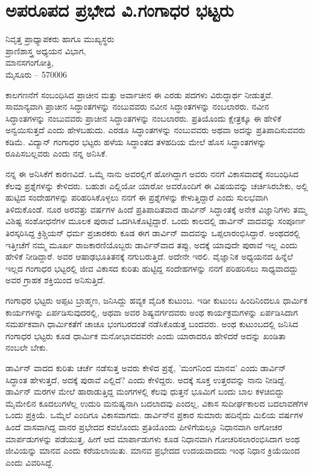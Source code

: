 \chapter{ಅಪರೂಪದ ಪ್ರಭೇದ ವಿ.ಗಂಗಾಧರ ಭಟ್ಟರು}

\begin{center}
\smallskip

ನಿವೃತ್ತ ಪ್ರಾಧ್ಯಾಪಕರು ಹಾಗೂ ಮುಖ್ಯಸ್ಥರು\\
ಪ್ರಾಣಿಶಾಸ್ತ್ರ ಅಧ್ಯಯನ ವಿಭಾಗ,\\ 
ಮಾನಸಗಂಗೋತ್ರಿ,\\ 
ಮೈಸೂರು – 570006
\addrule
\end{center}

ಕಾಲಗಣನೆಗೆ ಸಂಬಂಧಿಸಿದ ಪ್ರಾಚೀನ ಮತ್ತು ಅರ್ವಾಚೀನ ಈ ಎರಡು ಪದಗಳು ವಿರುದ್ಧಾರ್ಥ ನೀಡುತ್ತವೆ.  ಸಾಮಾನ್ಯವಾಗಿ ಪ್ರಾಚೀನ ಸಿದ್ಧಾಂತಗಳನ್ನು ನಂಬುವವರು ನವೀನ ಸಿದ್ಧಾಂತಗಳನ್ನು ನಂಬಲಾರರು.  ನವೀನ ಸಿದ್ಧಾಂತಗಳನ್ನು ನಂಬುವವರು ಪ್ರಾಚೀನ ಸಿದ್ಧಾಂತಗಳನ್ನು ನಂಬಲಾರರು.  ಪ್ರತಿಯೊಂದು ಕ್ಷೇತ್ರಕ್ಕೂ ಈ ಹೇಳಿಕೆ ಅನ್ವಯಿಸುತ್ತದೆ ಎಂದು ಹೇಳಬಹುದು.  ಎರಡೂ ಸಿದ್ಧಾಂತಗಳನ್ನು ನಂಬುವವರು ಅಥವಾ ಅದನ್ನು ಪ್ರತಿಪಾದಿಸುವವರು ಕಡಿಮೆ.  ವಿದ್ಯಾನ್ ಗಂಗಾಧರ ಭಟ್ಟರು ಹಳೆಯ ಸಿದ್ಧಾಂತದ ತಳಹದಿಯ ಮೇಲೆ ಹೊಸ ಸಿದ್ಧಾಂತಗಳನ್ನು ರೂಪಿಸಬಲ್ಲವರು ಎಂದು ನನ್ನ ಅನಿಸಿಕೆ.  

ನನ್ನ ಈ ಅನಿಸಿಕೆಗೆ ಕಾರಣವಿದೆ.  ಒಮ್ಮೆ ನಾನು ಅವರಲ್ಲಿಗೆ ಹೋಗಿದ್ದಾಗ ಅವರು ನನಗೆ ವಿಕಾಸವಾದಕ್ಕೆ ಸಂಬಂಧಿಸಿದ ಕೆಲವು ಪ್ರಶ್ನೆಗಳನ್ನು ಕೇಳಿದರು.  ಬಹುಶಃ ಎಲ್ಲಿಯೋ ಯಾರೋ ಅವರೊಂದಿಗೆ ಈ ವಿಷಯವನ್ನು ಚರ್ಚಿಸಿರಬೇಕು, ಅಲ್ಲಿ ಹುಟ್ಟಿದ ಸಂದೇಹಗಳನ್ನು ಪರಿಹರಿಸಿಕೊಳ್ಳಲು ನನಗೆ ಈ ಪ್ರಶ್ನೆಗಳನ್ನು ಕೇಳುತ್ತಿದ್ದಾರೆ ಎಂದು ಸುಲಭವಾಗಿ ತಿಳಿದುಕೊಂಡೆ.  ನೂರ ಅರವತ್ತು ವರ್ಷಗಳ ಹಿಂದೆ ಪ್ರತಿಪಾದಿತವಾದ ಡಾರ್ವಿನ್ ಸಿದ್ಧಾಂತಕ್ಕೆ ಅನೇಕ ವಿಜ್ಞಾನಿಗಳು ತಮ್ಮ ವಿಶಿಷ್ಟ ಸಂಶೋಧನೆಗಳ ಮೂಲಕ ಪುರಾವೆ ಒದಗಿಸಿಕೊಟ್ಟಿದ್ದಾರೆ.  ಒಂದು ಕಾಲದಲ್ಲಿ ಡಾರ್ವಿನ್ ವಾದವನ್ನು ಸಂಪೂರ್ಣ ತಿರಸ್ಕರಿಸಿದ್ದ ಕ್ರಿಶ್ಚಿಯನ್ ಧರ್ಮ ಪ್ರಚಾರಕರು ಕೂಡ ಈಗ ಡಾರ್ವಿನ್ ವಾದವನ್ನು ಒಪ್ಪಲಾರಂಭಿಸಿದ್ದಾರೆ.  ಅಂಥದರಲ್ಲಿ ಇತ್ತೀಚೆಗೆ ನಮ್ಮ ಮೂರ್ಖ ರಾಜಕಾರಣಿಯೊಬ್ಬರು ಡಾರ್ವಿನ್‍ವಾದ ತಪ್ಪು, ಅದಕ್ಕೆ ಯಾವುದೇ ಪುರಾವೆ ಇಲ್ಲ ಎಂದು ಹೇಳಿಕೆ ನೀಡಿದ್ದಾರೆ.  ಅವರ ಆಷಾಢಭೂತಿತನಕ್ಕೆ ನಗುಬರುತ್ತಿದೆ.  ಅದೇನೇ ಇರಲಿ.  ವೈಜ್ಞಾನಿಕ ಅಧ್ಯಯನದ ಹಿನ್ನೆಲೆ ಇಲ್ಲದ ಗಂಗಾಧರ ಭಟ್ಟರಲ್ಲಿ ಜೀವ ವಿಕಾಸದ ಕುರಿತು ಹುಟ್ಟಿದ್ದ ಸಂದೇಹಗಳನ್ನು ನನಗೆ ಪರಿಹರಿಸಲು ಸಾಧ್ಯವಾದದ್ದು ಅವರ ಗ್ರಾಹಕ ಶಕ್ತಿಯಿಂದ ಅನಿಸುತ್ತಿದೆ.  

ಗಂಗಾಧರ ಭಟ್ಟರು ಅಪ್ಪಟ ಬ್ರಾಹ್ಮಣ, ಜನಿಸಿದ್ದು ಹವ್ಯಕ ವೈದಿಕ ಕುಟುಂಬ.  ಇಡೀ ಕುಟುಂಬ ಹಿಂದಿನಿಂದಲೂ ಧಾರ್ಮಿಕ ಕಾರ್ಯಗಳನ್ನು ಏರ್ಪಡಿಸುವುದರಲ್ಲಿ, ಅಥವಾ ಅವರ ಶಿಷ್ಯವರ್ಗದವರು ಅಂಥ ಕಾರ್ಯಕ್ರಮಗಳನ್ನು ಏರ್ಪಡಿಸಿದಾಗ ಸಮರ್ಪಕವಾಗಿ ಧಾರ್ಮಿಕತೆಗೆ ಚಾಚೂ ಭಂಗಬರದಂತೆ ನಡೆಸಿಕೊಡುತ್ತ ಬಂದವರು.  ಅಂಥ ಕುಟುಂಬದಲ್ಲಿ ಜನಿಸಿದ ಗಂಗಾಧರ ಭಟ್ಟರು ಕೂಡ ಧಾರ್ಮಿಕ ಮನೋಭಾವದವರೇ ಎಂದು ಯಾರಾದರೂ ಹೇಳಿದರೆ ಅದನ್ನು ಖಂಡಿತಾ ನಂಬಲೇ ಬೇಕು.  

ಡಾರ್ವಿನ್ ವಾದದ ಕುರಿತು ಚರ್ಚೆ ನಡೆಸುತ್ತ ಅವರು ಕೇಳಿದ ಪ್ರಶ್ನೆ, 'ಮಂಗನಿಂದ ಮಾನವ' ಎಂದು ಡಾರ್ವಿನ್ ಸಿದ್ಧಾಂತ ಹೇಳುತ್ತದೆ, ಅದಕ್ಕೆ ಪುರಾವೆ ಎಲ್ಲಿದೆ?  ಎಂದು ಕೇಳಿದ್ದರು.  ಅದಕ್ಕೆ ಸೂಕ್ತ ಉತ್ತರವನ್ನು ನಾನು ನೀಡಿದ್ದೆ.  ಡಾರ್ವಿನ್ ಮರಗಳ ಮೇಲೆ ಹಾರಾಡುತ್ತಿದ್ದ ಮಂಗಗಳಲ್ಲಿ ಕೆಲವು ಧುತ್ತನೆ ಭೂಮಿಗೆ ಬಂದು ಬಾಲ ಕಳಚಿಬಿದ್ದು ಮೈಮೇಲಿನ ಕೂದಲುಗಳೆಲ್ಲ ಉದುರಿ ಮನುಷ್ಯನಾಗಿ ಬದಲಾದವು ಎಂದಲ್ಲ,  ವಿಕಾಸ ಸುದೀರ್ಘಕಾಲದ ಬದಲಾವಣೆಗಳ ಒಂದು ಪ್ರಕ್ರಿಯೆ.  ಒಮ್ಮೆಲೆ ಎಂದಿಗೂ ವಿಕಾಸವಾಗದು.  ಡಾರ್ವಿನ್‍ನ ಪ್ರಕಾರ ಸುಮಾರು ಹದಿನೈದು ಮಿಲಿಯ ವರ್ಷಗಳ ಹಿಂದೆ ವಾಸವಾಗಿದ್ದ ವಾನರ ಪ್ರಭೇದದ ಕವಲೊಂದು ಪ್ರತಿಯೊಂದು ಪೀಳಿಗೆಯಲ್ಲೂ ನಿಧಾನವಾಗಿ ಅಗೋಚರ  ಮಾರ್ಪಡುಗಳನ್ನು ಪಡೆಯುತ್ತ, ಹೀಗೆ ಆದ ಮಾರ್ಪಾಡುಗಳು ಕೂಡ ನಿಧಾನವಾಗಿ ಗೋಚರಿಸಲಾರಂಭಿಸಿದಾಗ ಅಂಥ ಜೀವಿಯನ್ನು ಮಾನವ ಎಂದು ಕರೆಯಲಾಯಿತು.  ಮಾನವ ಪ್ರಭೇದದ ಉದಯವಾದದು ಇಂಥ ನಿಧಾನ ಕ್ರಿಯೆಯಿಂದ ಎಂದು ವಿವರಿಸಿದ್ದೆ.  

